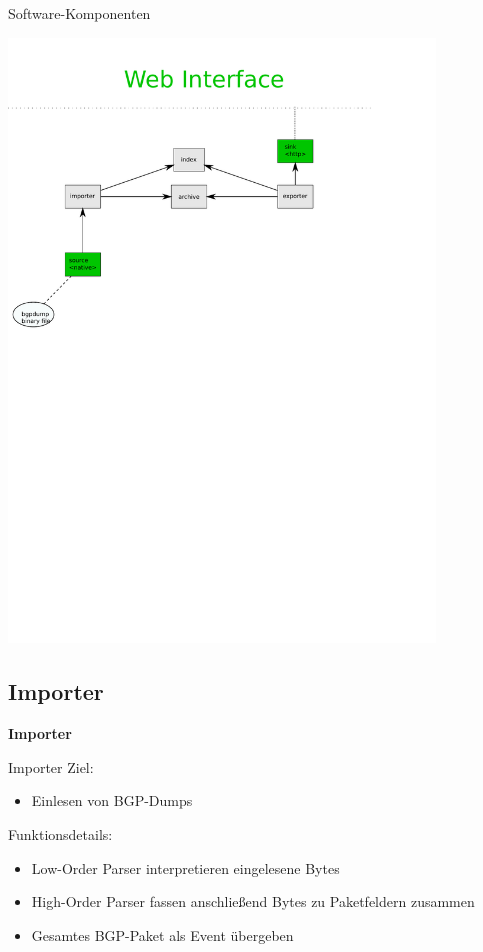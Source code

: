 \documentclass[9pt]{beamer}
\begin{document}
\begin{frame}{Software-Komponenten}{}
	\begin{center}
		\includegraphics[trim=0cm 14.5cm 3cm 1cm,clip,width=0.85\textwidth]{res/swp_vast.pdf}
	\end{center}
\end{frame}

\subsection{Importer}

\begin{frame}{}
	\begin{center}
		\LARGE \textbf{Importer}
	\end{center}
\end{frame}

\begin{frame}{Importer}{}
   Ziel:
   	\begin{itemize}
   	\item Einlesen von BGP-Dumps
   	\end{itemize}
   	\vspace{0,2cm}
   Funktionsdetails:
	\begin{itemize}
		\item Low-Order Parser interpretieren eingelesene Bytes
		\item High-Order Parser fassen anschließend Bytes zu Paketfeldern zusammen
		\item Gesamtes BGP-Paket als Event übergeben
	\end{itemize}
\end{frame}
\end{document}
